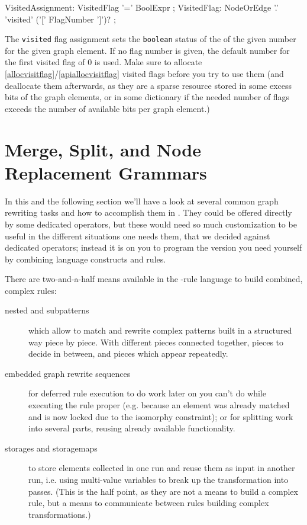 \begin{rail}    
  VisitedAssignment:
    VisitedFlag '=' BoolExpr
	;
	VisitedFlag:
    NodeOrEdge '.' 'visited' ('[' FlagNumber ']')?
  ;
\end{rail}

The \texttt{visited} flag assignment sets the \texttt{boolean} status of the  of the given number for the given graph element.
If no flag number is given, the default number for the first visited flag of 0 is used.
Make sure to allocate \ref{allocvisitflag}/\ref{apiallocvisitflag} visited flags before you try to use them 
(and deallocate them afterwards, as they are a sparse resource stored in some excess bits of the graph elements, or in some dictionary if the needed number of flags exceeds the number of available bits per graph element.)


\section{Merge, Split, and Node Replacement Grammars}\label{sub:mergesplit}

In this and the following section we'll have a look at several common graph rewriting tasks and how to accomplish them in \GrG.
They could be offered directly by some dedicated operators,
but these would need so much customization to be useful in the different situations one needs them,
that we decided against dedicated operators; 
instead it is on you to program the version you need yourself by combining language constructs and rules.

There are two-and-a-half means available in the \GrG-rule language to build combined, complex rules:
\begin{description}
	\item[nested and subpatterns]
which allow to match and rewrite complex patterns built in a structured way piece by piece.
With different pieces connected together, pieces to decide in between, and pieces which appear repeatedly. 
	\item[embedded graph rewrite sequences]
for deferred rule execution to do work later on you can't do while executing the rule proper (e.g. because an element was already matched and is now locked due to the isomorphy constraint); or for splitting work into several parts, reusing already available functionality.
	\item[storages and storagemaps]
to store elements collected in one run and reuse them as input in another run, i.e. using multi-value variables to break up the transformation into passes. (This is the half point, as they are not a means to build a complex rule, but a means to communicate between rules building complex transformations.)
\end{description}

